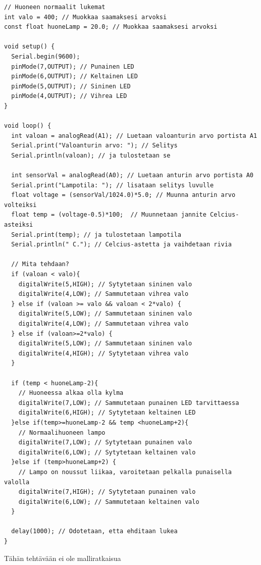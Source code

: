 \begin{lstlisting}[numbers=none]
// Huoneen normaalit lukemat
int valo = 400; // Muokkaa saamaksesi arvoksi
const float huoneLamp = 20.0; // Muokkaa saamaksesi arvoksi

void setup() {
  Serial.begin(9600);
  pinMode(7,OUTPUT); // Punainen LED
  pinMode(6,OUTPUT); // Keltainen LED
  pinMode(5,OUTPUT); // Sininen LED
  pinMode(4,OUTPUT); // Vihrea LED
}

void loop() {
  int valoan = analogRead(A1); // Luetaan valoanturin arvo portista A1
  Serial.print("Valoanturin arvo: "); // Selitys
  Serial.println(valoan); // ja tulostetaan se
  
  int sensorVal = analogRead(A0); // Luetaan anturin arvo portista A0
  Serial.print("Lampotila: "); // lisataan selitys luvulle
  float voltage = (sensorVal/1024.0)*5.0; // Muunna anturin arvo volteiksi
  float temp = (voltage-0.5)*100;  // Muunnetaan jannite Celcius-asteiksi
  Serial.print(temp); // ja tulostetaan lampotila
  Serial.println(" C."); // Celcius-astetta ja vaihdetaan rivia

  // Mita tehdaan? 
  if (valoan < valo){
    digitalWrite(5,HIGH); // Sytytetaan sininen valo
    digitalWrite(4,LOW); // Sammutetaan vihrea valo
  } else if (valoan >= valo && valoan < 2*valo) {
    digitalWrite(5,LOW); // Sammutetaan sininen valo
    digitalWrite(4,LOW); // Sammutetaan vihrea valo
  } else if (valoan>=2*valo) {
    digitalWrite(5,LOW); // Sammutetaan sininen valo
    digitalWrite(4,HIGH); // Sytytetaan vihrea valo
  }

  if (temp < huoneLamp-2){
    // Huoneessa alkaa olla kylma
    digitalWrite(7,LOW); // Sammutetaan punainen LED tarvittaessa
    digitalWrite(6,HIGH); // Sytytetaan keltainen LED
  }else if(temp>=huoneLamp-2 && temp <huoneLamp+2){
    // Normaalihuoneen lampo
    digitalWrite(7,LOW); // Sytytetaan punainen valo
    digitalWrite(6,LOW); // Sytytetaan keltainen valo
  }else if (temp>huoneLamp+2) {
    // Lampo on noussut liikaa, varoitetaan pelkalla punaisella valolla
    digitalWrite(7,HIGH); // Sytytetaan punainen valo
    digitalWrite(6,LOW); // Sammutetaan keltainen valo
  }
 
  delay(1000); // Odotetaan, etta ehditaan lukea
}
\end{lstlisting}



\begin{tcolorbox}[colback=yellow!10, title={Koodaa!},colbacktitle=orange,breakable]
\vspace{15cm}
\begin{solution}

Tähän tehtävään ei ole malliratkaisua
\end{solution}
\end{tcolorbox}